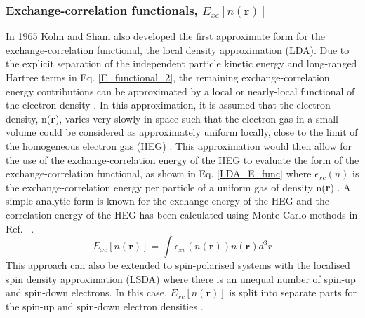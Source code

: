 \documentclass[11pt, twoside]{report}
\begin{document}



\subsubsection{Exchange-correlation functionals, $E_{xc}[n(\textbf{r})]$}
In 1965 Kohn and Sham also developed the first approximate form for the exchange-correlation functional, the local density approximation (LDA). Due to the explicit separation of the independent particle kinetic energy and long-ranged Hartree terms in Eq. \ref{E_functional_2}, the remaining exchange-correlation energy contributions can be approximated by a local or nearly-local functional of the electron density \cite{RichardMartin_Ch7}. In this approximation, it is assumed that the electron density, n(\textbf{r}), varies very slowly in space such that the electron gas in a small volume could be considered as approximately uniform locally, close to the limit of the homogeneous electron gas (HEG) \cite{RichardMartin_Ch8}. This approximation would then allow for the use of the exchange-correlation energy of the HEG to evaluate the form of the exchange-correlation functional, as shown in Eq. \ref{LDA_E_func} where $\epsilon_{xc}(n)$ is the exchange-correlation energy per particle of a uniform gas of density n(\textbf{r}) \cite{Prasad_ch3}. A simple analytic form is known for the exchange energy of the HEG and the correlation energy of the HEG has been calculated using Monte Carlo methods in Ref.~ \cite{RichardMartin_Ch8}.
\begin{equation}\label{LDA_E_func}
E_{xc}[n(\mathbf{r})] = \int \epsilon_{xc}(n(\mathbf{r}))n(\mathbf{r})d^3r
\end{equation}
This approach can also be extended to spin-polarised systems with the localised spin density approximation (LSDA) where there is an unequal number of spin-up and spin-down electrons. In this case, $E_{xc}[n(\mathbf{r})]$ is split into separate parts for the spin-up and spin-down electron densities \cite{Prasad_ch3}.
\end{document}
